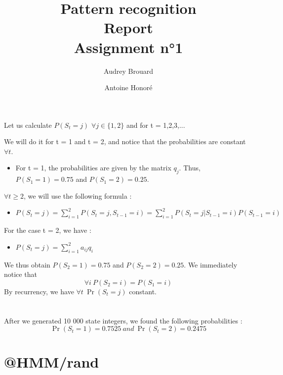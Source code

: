 \documentclass[a4paper]{report}
\title{Pattern recognition\\Report\\Assignment n°1}
\author{Audrey Brouard \and Antoine Honoré}
\begin{document}

\section{}

Let us calculate $P(S_{t}=j)$ $ \forall j\in\{1,2\} $ and for t = 1,2,3,...

We will do it for t = 1 and t = 2, and notice that the probabilities are constant $\forall t$.

\begin{itemize}
  \item For t = 1, the probabilities are given by the matrix $q_{j}$. Thus, $P(S_{1}=1) = 0.75$ and $P(S_{1}=2) = 0.25$.\\
\end{itemize}
$\forall t\geq 2$, we will use the following formula :

	\begin{itemize}
	  \item $P(S_{t}=j) = \sum_{i=1}^{2} P({S_t}=j,S_{t-1}=i) = \sum_{i=1}^{2} P(S_t=j|S_{t-1}=i)P(S_{t-1}=i)$\\
	\end{itemize}

For the case t = 2, we have :
\begin{itemize}
  \item $P(S_t=j) = \sum_{i=1}^{2} a_{ij} q_i$
\end{itemize}

We thus obtain $P(S_{2}=1)=0.75$  and $P(S_{2}=2)=0.25$.
We immediately notice that \[\forall i~P(S_{2}=i) = P(S_{1}=i)\]
By recurrency, we have $\forall t~\Pr(S_{t}=j)$ constant.

\section{}
After we generated 10 000 state integers, we found the following probabilities :
\[\Pr(S_{t} = 1) = 0.7525~and~\Pr(S_{t} = 2) = 0.2475\]

\section{@HMM/rand}
\end{document}
